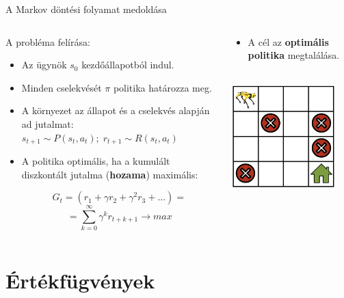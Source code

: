 \documentclass[english, aspectratio=169]{beamer}
\begin{document}
\begin{frame}{A Markov döntési folyamat medoldása}
\begin{columns}
\begin{column}{.6\textwidth}
A probléma felírása: 
\begin{itemize}
	\item Az ügynök $s_0$ kezdőállapotból indul.
	\item Minden cselekvését $\pi$ politika határozza meg.
	\item A környezet az állapot és a cselekvés alapján ad jutalmat:\\
	$s_{t+1}\sim{P(s_{t}, a_{t})};\;r_{t+1}\sim{R(s_{t}, a_{t})}$
	\item A politika optimális, ha a kumulált diszkontált jutalma (\textbf{hozama}) maximális:\\
	\begin{block}{}
	\[	
	G_{t} = (r_{1} + \gamma r_{2} + \gamma ^2 r_{3} + ...)=
	\]
	\[	
	=\sum_{k=0}^{\infty}\gamma^{k}r_{t+k+1} \rightarrow max
	\]
	\end{block}
\end{itemize}
\end{column}
\begin{column}{.4\textwidth}
\begin{itemize}
	\item A cél az \textbf{optimális politika} megtalálása.
\end{itemize}
\begin{center}
\includegraphics[width=4cm, height=5cm, keepaspectratio]{images/reinf_8.png}
\end{center}
\end{column}
\end{columns}
\end{frame}

\section{Értékfügvények}
\end{document}
